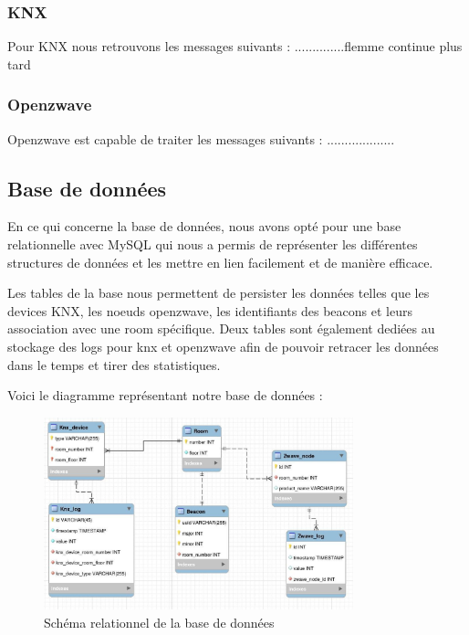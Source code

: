 \subsubsection{KNX}
Pour KNX nous retrouvons les messages suivants : 
..............flemme continue plus tard

\subsubsection{Openzwave}
Openzwave est capable de traiter les messages suivants : 
...................

\subsection{Base de données}
En ce qui concerne la base de données, nous avons opté pour une base relationnelle avec MySQL qui nous a permis de représenter les différentes structures de données et les mettre en lien facilement et de manière efficace.

Les tables de la base nous permettent de persister les données telles que les devices KNX, les noeuds openzwave, les identifiants des beacons et leurs association avec une room spécifique. Deux tables sont également dediées au stockage des logs pour knx et openzwave afin de pouvoir retracer les données dans le temps et tirer des statistiques.

Voici le diagramme représentant notre base de données :


\begin{figure}
    \begin{center}
        \includegraphics[width=0.8\textwidth]{img/diagramme_db.jpg}
    \end{center}
    \caption{Schéma relationnel de la base de données}
    \label{db_schema}
\end{figure}
